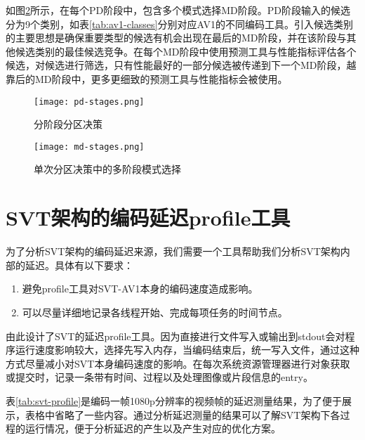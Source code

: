   如图\ref{fig:md}所示，在每个PD阶段中，包含多个模式选择MD阶段。PD阶段输入的候选分为9个类别，如表\ref{tab:av1-classes}分别对应AV1的不同编码工具。引入候选类别的主要思想是确保重要类型的候选有机会出现在最后的MD阶段，并在该阶段与其他候选类别的最佳候选竞争。在每个MD阶段中使用预测工具与性能指标评估各个候选，对候选进行筛选，只有性能最好的一部分候选被传递到下一个MD阶段，越靠后的MD阶段中，更多更细致的预测工具与性能指标会被使用。



  \begin{figure}[!htp]
    \centering
    \texttt{[image: pd-stages.png]}
    \caption{分阶段分区决策\cite{EncoderDesignSVTAV1}}
  \label{fig:pd}
  \end{figure}

  \begin{figure}[!htp]
    \centering
    \texttt{[image: md-stages.png]}
    \caption{单次分区决策中的多阶段模式选择\cite{EncoderDesignSVTAV1}}
  \label{fig:md}
  \end{figure}
\section{SVT架构的编码延迟profile工具} \label{sec:svt-profile}
  为了分析SVT架构的编码延迟来源，我们需要一个工具帮助我们分析SVT架构内部的延迟。具体有以下要求：
  \begin{enumerate} [label=\arabic*)]
    \item 避免profile工具对SVT-AV1本身的编码速度造成影响。
    \item 可以尽量详细地记录各线程开始、完成每项任务的时间节点。
  \end{enumerate}

  由此设计了SVT的延迟profile工具。因为直接进行文件写入或输出到stdout会对程序运行速度影响较大，选择先写入内存，当编码结束后，统一写入文件，通过这种方式尽量减小对SVT本身编码速度的影响。在每次系统资源管理器进行对象获取或提交时，记录一条带有时间、过程以及处理图像或片段信息的entry。

  表\ref{tab:svt-profile}是编码一帧1080p分辨率的视频帧的延迟测量结果，为了便于展示，表格中省略了一些内容。通过分析延迟测量的结果可以了解SVT架构下各过程的运行情况，便于分析延迟的产生以及产生对应的优化方案。

